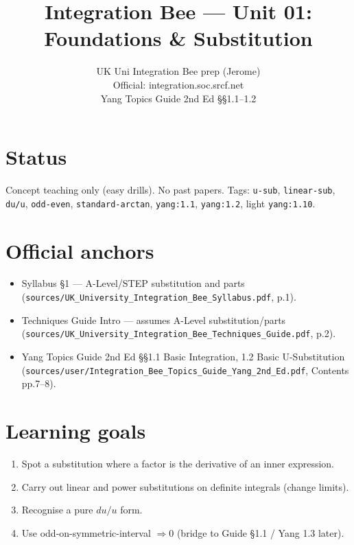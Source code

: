 
\title{Integration Bee --- Unit 01:\\ Foundations \& Substitution}
\author{UK Uni Integration Bee prep (Jerome)\\ Official: integration.soc.srcf.net\\ Yang Topics Guide 2nd Ed §§1.1--1.2}
\date{}

\maketitle

\section*{Status}
Concept teaching only (easy drills). No past papers.
Tags: \texttt{u-sub}, \texttt{linear-sub}, \texttt{du/u}, \texttt{odd-even}, \texttt{standard-arctan},
\texttt{yang:1.1}, \texttt{yang:1.2}, light \texttt{yang:1.10}.

\section{Official anchors}
\begin{itemize}
  \item Syllabus §1 --- A-Level/STEP substitution and parts
        (\texttt{sources/UK\_University\_Integration\_Bee\_Syllabus.pdf}, p.1).
  \item Techniques Guide Intro --- assumes A-Level substitution/parts
        (\texttt{sources/UK\_University\_Integration\_Bee\_Techniques\_Guide.pdf}, p.2).
  \item Yang Topics Guide 2nd Ed §§1.1 Basic Integration, 1.2 Basic U-Substitution
        (\texttt{sources/user/Integration\_Bee\_Topics\_Guide\_Yang\_2nd\_Ed.pdf}, Contents pp.7--8).
\end{itemize}

\section{Learning goals}
\begin{enumerate}
  \item Spot a substitution where a factor is the derivative of an inner expression.
  \item Carry out linear and power substitutions on definite integrals (change limits).
  \item Recognise a pure \(du/u\) form.
  \item Use odd-on-symmetric-interval \(\Rightarrow 0\) (bridge to Guide §1.1 / Yang 1.3 later).
\end{enumerate}

